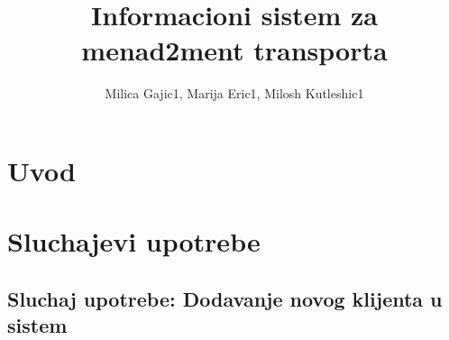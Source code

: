 \documentclass{article}
\title{Informacioni sistem za menad2ment transporta}
\author{Milica Gajic1, Marija Eric1, Milosh Kutleshic1}
\begin{document}
\maketitle
\newpage


\renewcommand*\contentsname{Sadrz1aj}
\tableofcontents
\newpage

\section{Uvod}

\section{Sluchajevi upotrebe}
\subsection{Sluchaj upotrebe: Dodavanje novog klijenta u sistem}







\end{document}
